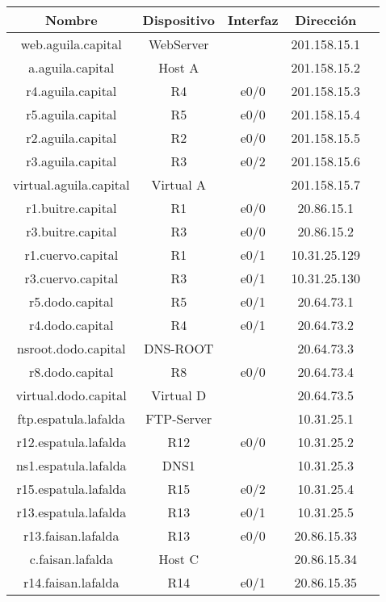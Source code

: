\begin{tabular}{|c|c|c|c|c|}
	\hline
	Nombre & Dispositivo & Interfaz & Dirección \\
	\hline

	\hline
	web.aguila.capital & WebServer & & 201.158.15.1 \\
	\hline
	a.aguila.capital & Host A & & 201.158.15.2 \\
	\hline
	r4.aguila.capital & R4 & e0/0 & 201.158.15.3 \\
	\hline
	r5.aguila.capital & R5 & e0/0 & 201.158.15.4 \\
	\hline
	r2.aguila.capital & R2 & e0/0 & 201.158.15.5 \\
	\hline
	r3.aguila.capital & R3 & e0/2 & 201.158.15.6 \\
	\hline
	virtual.aguila.capital & Virtual A & & 201.158.15.7 \\
	\hline

	\hline
	r1.buitre.capital  & R1 & e0/0 & 20.86.15.1 \\
	\hline
	r3.buitre.capital  & R3 & e0/0 & 20.86.15.2 \\
	\hline

	\hline
	r1.cuervo.capital & R1 & e0/1 & 10.31.25.129 \\
	\hline
  	r3.cuervo.capital & R3 & e0/1 & 10.31.25.130 \\
	\hline

	\hline
	r5.dodo.capital & R5 & e0/1 & 20.64.73.1 \\
	\hline
	r4.dodo.capital & R4 & e0/1 & 20.64.73.2 \\
	\hline
	nsroot.dodo.capital & DNS-ROOT & & 20.64.73.3 \\
	\hline
	r8.dodo.capital & R8 & e0/0 & 20.64.73.4 \\
	\hline
	virtual.dodo.capital & Virtual D & & 20.64.73.5 \\
	\hline

	\hline
	ftp.espatula.lafalda & FTP-Server & & 10.31.25.1 \\
	\hline
	r12.espatula.lafalda & R12 & e0/0 & 10.31.25.2 \\
	\hline
	ns1.espatula.lafalda & DNS1 & & 10.31.25.3 \\
	\hline
	r15.espatula.lafalda & R15 & e0/2 & 10.31.25.4 \\
	\hline
	r13.espatula.lafalda & R13 & e0/1 & 10.31.25.5 \\
	\hline

	\hline
	r13.faisan.lafalda & R13 & e0/0 & 20.86.15.33 \\
	\hline
	c.faisan.lafalda & Host C & & 20.86.15.34 \\
	\hline
	r14.faisan.lafalda & R14 & e0/1 & 20.86.15.35 \\
	\hline


\end{tabular}
